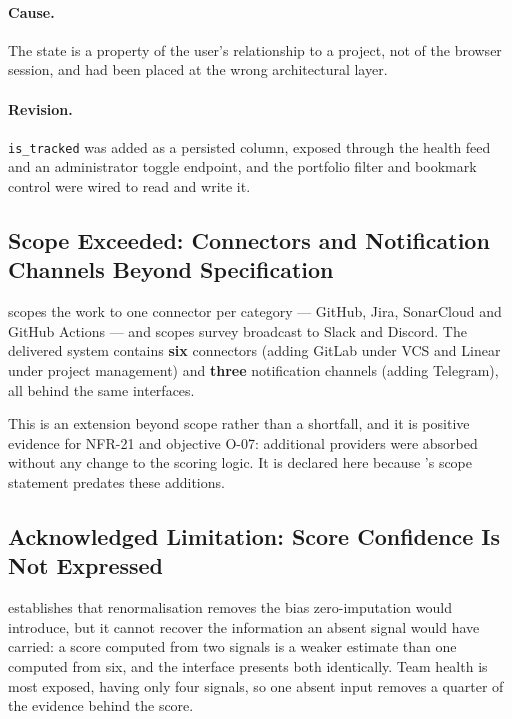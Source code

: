 \paragraph{Cause.} The state is a property of the user's relationship to a
project, not of the browser session, and had been placed at the wrong
architectural layer.

\paragraph{Revision.} \texttt{is\_tracked} was added as a persisted column,
exposed through the health feed and an administrator toggle endpoint, and the
portfolio filter and bookmark control were wired to read and write it.

\subsection{Scope Exceeded: Connectors and Notification Channels Beyond
Specification}
\label{subsec:deviation-connectors}

 scopes the work to one connector per category --- GitHub,
Jira, SonarCloud and GitHub Actions --- and scopes survey broadcast to Slack and
Discord. The delivered system contains \textbf{six} connectors (adding GitLab
under VCS and Linear under project management) and \textbf{three} notification
channels (adding Telegram), all behind the same interfaces.

This is an extension beyond scope rather than a shortfall, and it is positive
evidence for NFR-21 and objective O-07: additional providers were absorbed
without any change to the scoring logic. It is declared here because
's scope statement predates these additions.

\subsection{Acknowledged Limitation: Score Confidence Is Not Expressed}
\label{subsec:deviation-confidence}

 establishes that renormalisation removes the bias
zero-imputation would introduce, but it cannot recover the information an
absent signal would have carried: a score computed from two signals is a weaker
estimate than one computed from six, and the interface presents both
identically. Team health is most exposed, having only four signals, so one
absent input removes a quarter of the evidence behind the score.

